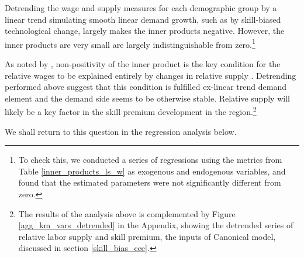 \documentclass[11pt]{article}
\begin{document}
Detrending the wage and supply measures for each demographic group by a linear trend simulating smooth linear demand growth, such as by skill-biased technological change, largely makes the inner products negative. However, the inner products are very small are largely indistinguishable from zero.\footnote{To check this, we conducted a series of regressions using the metrics from Table \ref{inner_products_ls_w} as exogenous and endogenous variables, and found that the estimated parameters were not significantly different from zero.}

As noted by \citeauthor{katz1992changes}, non-positivity of the inner product is the key condition for the relative wages to be explained entirely by changes in relative supply . Detrending performed above suggest that this condition is fulfilled ex-linear trend demand element and the demand side seems to be otherwise stable. Relative supply will likely be a key factor in the skill premium development in the region.\footnote{ The results of the analysis above is complemented by Figure \ref{agg_km_vars_detrended} in the Appendix, showing the detrended series of relative labor supply and skill premium, the inputs of Canonical model, discussed in section \ref{skill_bias_cee}. %
}

We shall return to this question in the regression analysis below.





\end{document}
